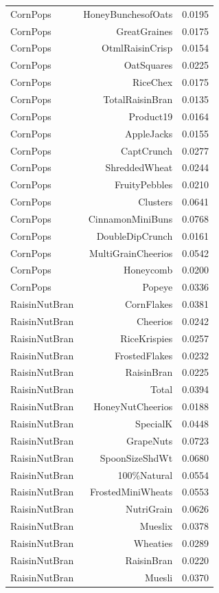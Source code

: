 \begin{longtable}{@{}lrr@{}}
CornPops & HoneyBunchesofOats & 0.0195 \\
CornPops & GreatGraines & 0.0175 \\
CornPops & OtmlRaisinCrisp & 0.0154 \\
CornPops & OatSquares & 0.0225 \\
CornPops & RiceChex & 0.0175 \\
CornPops & TotalRaisinBran & 0.0135 \\
CornPops & Product19 & 0.0164 \\
CornPops & AppleJacks & 0.0155 \\
CornPops & CaptCrunch & 0.0277 \\
CornPops & ShreddedWheat & 0.0244 \\
CornPops & FruityPebbles & 0.0210 \\
CornPops & Clusters & 0.0641 \\
CornPops & CinnamonMiniBuns & 0.0768 \\
CornPops & DoubleDipCrunch & 0.0161 \\
CornPops & MultiGrainCheerios & 0.0542 \\
CornPops & Honeycomb & 0.0200 \\
CornPops & Popeye & 0.0336 \\
RaisinNutBran & CornFlakes & 0.0381 \\
RaisinNutBran & Cheerios & 0.0242 \\
RaisinNutBran & RiceKrispies & 0.0257 \\
RaisinNutBran & FrostedFlakes & 0.0232 \\
RaisinNutBran & RaisinBran & 0.0225 \\
RaisinNutBran & Total & 0.0394 \\
RaisinNutBran & HoneyNutCheerios & 0.0188 \\
RaisinNutBran & SpecialK & 0.0448 \\
RaisinNutBran & GrapeNuts & 0.0723 \\
RaisinNutBran & SpoonSizeShdWt & 0.0680 \\
RaisinNutBran & 100\%Natural & 0.0554 \\
RaisinNutBran & FrostedMiniWheats & 0.0553 \\
RaisinNutBran & NutriGrain & 0.0626 \\
RaisinNutBran & Mueslix & 0.0378 \\
RaisinNutBran & Wheaties & 0.0289 \\
RaisinNutBran & RaisinBran & 0.0220 \\
RaisinNutBran & Muesli & 0.0370 \\

\end{longtable}
